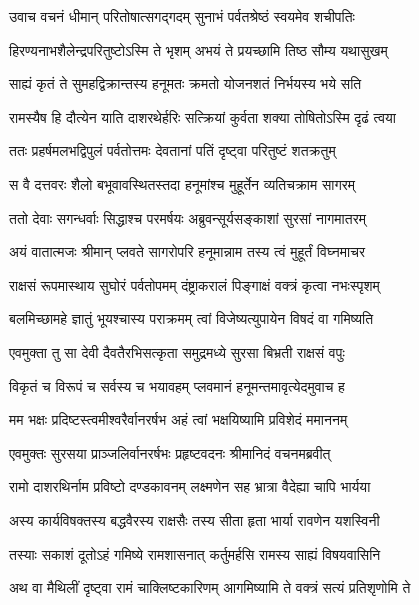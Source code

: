 \twolineshloka
{उवाच वचनं धीमान् परितोषात्सगद्गदम्}
{सुनाभं पर्वतश्रेष्ठं स्वयमेव शचीपतिः} %

\twolineshloka
{हिरण्यनाभशैलेन्द्रपरितुष्टोऽस्मि ते भृशम्}
{अभयं ते प्रयच्छामि तिष्ठ सौम्य यथासुखम्} %

\twolineshloka
{साह्यं कृतं ते सुमहद्विक्रान्तस्य हनूमतः}
{क्रमतो योजनशतं निर्भयस्य भये सति} %

\twolineshloka
{रामस्यैष हि दौत्येन याति दाशरथेर्हरिः}
{सत्क्रियां कुर्वता शक्या तोषितोऽस्मि दृढं त्वया} %

\twolineshloka
{ततः प्रहर्षमलभद्विपुलं पर्वतोत्तमः}
{देवतानां पतिं दृष्ट्वा परितुष्टं शतक्रतुम्} %

\twolineshloka
{स वै दत्तवरः शैलो बभूवावस्थितस्तदा}
{हनूमांश्च मुहूर्तेन व्यतिचक्राम सागरम्} %

\twolineshloka
{ततो देवाः सगन्धर्वाः सिद्धाश्च परमर्षयः}
{अब्रुवन्सूर्यसङ्काशां सुरसां नागमातरम्} %

\twolineshloka
{अयं वातात्मजः श्रीमान् प्लवते सागरोपरि}
{हनूमान्नाम तस्य त्वं मुहूर्तं विघ्नमाचर} %

\twolineshloka
{राक्षसं रूपमास्थाय सुघोरं पर्वतोपमम्}
{दंष्ट्राकरालं पिङ्गाक्षं वक्त्रं कृत्वा नभःस्पृशम्} %

\twolineshloka
{बलमिच्छामहे ज्ञातुं भूयश्चास्य पराक्रमम्}
{त्वां विजेष्यत्युपायेन विषदं वा गमिष्यति} %

\twolineshloka
{एवमुक्ता तु सा देवी दैवतैरभिसत्कृता}
{समुद्रमध्ये सुरसा बिभ्रती राक्षसं वपुः} %

\twolineshloka
{विकृतं च विरूपं च सर्वस्य च भयावहम्}
{प्लवमानं हनूमन्तमावृत्येदमुवाच ह} %

\twolineshloka
{मम भक्षः प्रदिष्टस्त्वमीश्वरैर्वानरर्षभ}
{अहं त्वां भक्षयिष्यामि प्रविशेदं ममाननम्} %

\twolineshloka
{एवमुक्तः सुरसया प्राञ्जलिर्वानरर्षभः}
{प्रहृष्टवदनः श्रीमानिदं वचनमब्रवीत्} %

\twolineshloka
{रामो दाशरथिर्नाम प्रविष्टो दण्डकावनम्}
{लक्ष्मणेन सह भ्रात्रा वैदेह्या चापि भार्यया} %

\twolineshloka
{अस्य कार्यविषक्तस्य बद्धवैरस्य राक्षसैः}
{तस्य सीता हृता भार्या रावणेन यशस्विनी} %

\twolineshloka
{तस्याः सकाशं दूतोऽहं गमिष्ये रामशासनात्}
{कर्तुमर्हसि रामस्य साह्यं विषयवासिनि} %

\twolineshloka
{अथ वा मैथिलीं दृष्ट्वा रामं चाक्लिष्टकारिणम्}
{आगमिष्यामि ते वक्त्रं सत्यं प्रतिशृणोमि ते} %

